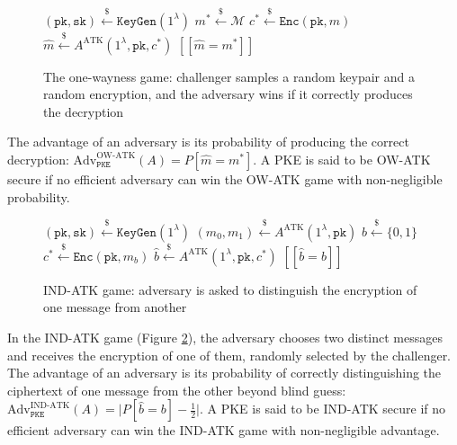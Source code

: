 \documentclass[letterpaper,12pt,titlepage,oneside,final]{book}
\newcommand{\pke}{\texttt{PKE}}
\newcommand{\keygen}{\texttt{KeyGen}}
\newcommand{\encrypt}{\texttt{Enc}}
\newcommand{\pk}{\texttt{pk}}
\newcommand{\sk}{\texttt{sk}}
\newcommand{\leftsample}{\stackrel{\$}{\leftarrow}}
\newcommand{\llbrack}{[\![}
\newcommand{\rrbrack}{]\!]}
\begin{document}
\begin{figure}[htbp]
    \centering
    \begin{minipage}[t]{0.45\textwidth}
    \begin{algorithm}[H]
        \caption*{OW-ATK game}
        \begin{algorithmic}[1]
            \State $(\pk, \sk) \leftsample \keygen(1^\lambda)$
            \State $m^\ast \leftsample \mathcal{M}$
            \State $c^\ast \leftsample \encrypt(\pk, m)$
            \State $\hat{m} \leftsample A^\text{ATK}(1^\lambda, \pk, c^\ast)$
            \State \Return $\llbrack \hat{m} = m^\ast \rrbrack$
        \end{algorithmic}
    \end{algorithm}
    \end{minipage}
    \caption{The one-wayness game: challenger samples a random keypair and a random encryption, and the adversary wins if it correctly produces the decryption}\label{fig:pke-ow-atk-game}
\end{figure}

The advantage of an adversary is its probability of producing the correct decryption: $\text{Adv}^\text{OW-ATK}_\pke(A) = P[\hat{m} = m^\ast]$. A PKE is said to be OW-ATK secure if no efficient adversary can win the OW-ATK game with non-negligible probability.

\begin{figure}[htbp]
    \centering
    \begin{minipage}[t]{0.5\textwidth}
        \begin{algorithm}[H]
            \caption*{IND-ATK game}
            \begin{algorithmic}[1]
                \State $(\pk, \sk) \leftsample \keygen(1^\lambda)$
                \State $(m_0, m_1) \leftsample A^\text{ATK}(1^\lambda, \pk)$
                \State $b \leftsample \{0,1\}$
                \State $c^\ast \leftsample \encrypt(\pk, m_b)$
                \State $\hat{b} \leftsample A^\text{ATK}(1^\lambda, \pk, c^\ast)$
                \State \Return $\llbrack \hat{b} = b \rrbrack$
            \end{algorithmic}
        \end{algorithm}
    \end{minipage}
    \caption{IND-ATK game: adversary is asked to distinguish the encryption of one message from another}\label{fig:pke-ind-atk-game}
\end{figure}

In the IND-ATK game (Figure \ref{fig:pke-ind-atk-game}), the adversary chooses two distinct messages and receives the encryption of one of them, randomly selected by the challenger. The advantage of an adversary is its probability of correctly distinguishing the ciphertext of one message from the other beyond blind guess: $\text{Adv}^\text{IND-ATK}_\pke(A) = \vert P[\hat{b} = b] - \frac{1}{2}\vert$. A PKE is said to be IND-ATK secure if no efficient adversary can win the IND-ATK game with non-negligible advantage.
\end{document}

